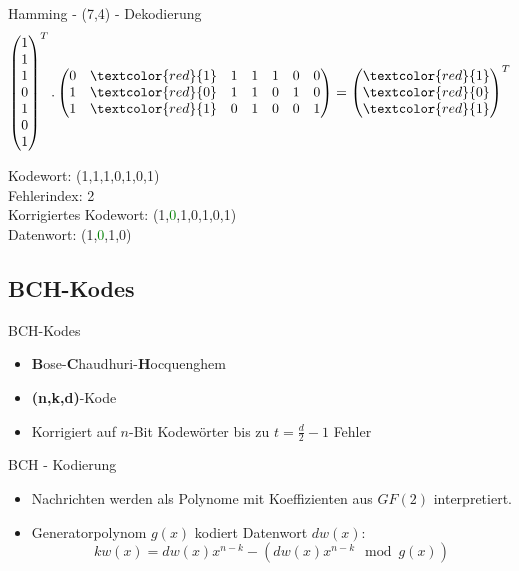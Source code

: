 \documentclass[xcolor=dvipsnames]{beamer}
\begin{document}
\begin{frame}{Hamming - (7,4) - Dekodierung}
\[\begin{pmatrix}1\\1\\1\\0\\1\\0\\1\\ \end{pmatrix}^T. \begin{pmatrix}0&\textcolor{red}{1}&1&1&1&0&0\\1&\textcolor{red}{0}&1&1&0&1&0\\1&\textcolor{red}{1}&0&1&0&0&1\end{pmatrix} = \begin{pmatrix}\textcolor{red}{1}\\\textcolor{red}{0}\\\textcolor{red}{1}\\ \end{pmatrix}^T\]

Kodewort: (1,1,1,0,1,0,1) \\ 
Fehlerindex: 2 \\ 
Korrigiertes Kodewort: (1,\textcolor{green}{0},1,0,1,0,1)\\
Datenwort: (1,\textcolor{green}{0},1,0)
\end{frame}

\subsection{BCH-Kodes}

\begin{frame}{BCH-Kodes}
\begin{itemize}[<+->]
\item \textbf{B}ose-\textbf{C}haudhuri-\textbf{H}ocquenghem
\item \textbf{(n,k,d)}-Kode
\item Korrigiert auf $n$-Bit Kodewörter bis zu $t=\frac{d}{2}-1$ Fehler
\end{itemize}
\end{frame}

\begin{frame}{BCH - Kodierung}
\begin{itemize}[<+->]
\item Nachrichten werden als Polynome mit Koeffizienten aus $GF(2)$ interpretiert.
\item Generatorpolynom $g(x)$ kodiert Datenwort $dw(x)$: $$kw(x) = dw(x)x^{n-k} - \left(dw(x)x^{n-k} \mod g(x)\right)$$
\end{itemize}
\end{frame}
\end{document}
